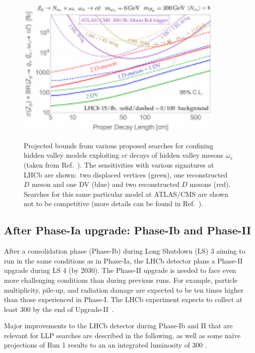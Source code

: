 \begin{figure}[t]
  \centering
  {\includegraphics[width=0.9\textwidth]{figures/lhcb_hvlimits2.pdf}}
  \caption{Projected bounds from various proposed searches for confining hidden valley models exploiting $c\bar{c}$ decays of hidden valley mesons $\omega_v$ (taken from Ref.~\cite{Pierce:2017taw}). The sensitivities with various signatures at LHCb are shown:~two displaced vertices (green), one reconstructed $D$ meson and one DV (blue) and two reconstructed $D$ mesons (red). Searches for this same particular model at ATLAS/CMS are shown not to be competitive (more details can be found in Ref.~\cite{Pierce:2017taw}).}
  \label{fig:HVlim}
\end{figure}

\subsection{After Phase-Ia upgrade: Phase-Ib and Phase-II}
\label{sec:ulhcbphaseii}

After a consolidation phase (Phase-Ib) during Long Shutdown (LS) 3 aiming to run in the same conditions as in Phase-Ia, the LHCb detector plans a Phase-II upgrade during LS 4 (by 2030). The Phase-II upgrade is needed to face even more challenging conditions than during previous runs. For example, particle multiplicity, pile-up, and radiation damage are expected to be ten times higher than those experienced in Phase-I. The LHCb experiment expects to collect at least 300 \invfb by the end of Upgrade-II~\cite{LHCbUpgradeIIPC}.

Major improvements to the LHCb detector during Phase-Ib and II that are relevant for LLP searches are described in the following, as well as some na\"ive projections of Run 1 results to an an integrated luminosity of 300 \invfb.



